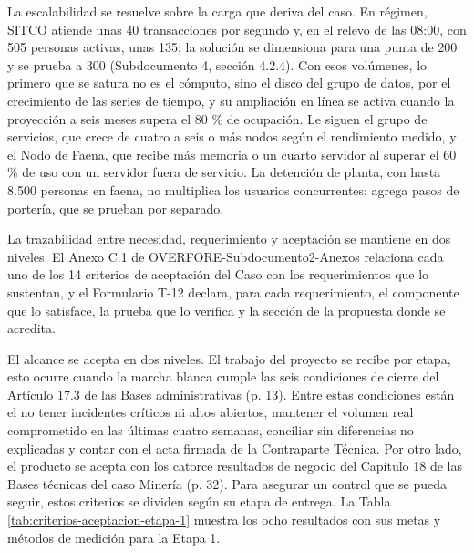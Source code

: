 \documentclass[subdoc]{../../comun/overfore}
\begin{document}
La escalabilidad se resuelve sobre la carga que deriva del caso. En régimen, SITCO atiende unas 40 transacciones por segundo y, en el relevo de las 08:00, con 505 personas activas, unas 135; la solución se dimensiona para una punta de 200 y se prueba a 300 (Subdocumento 4, sección 4.2.4). Con esos volúmenes, lo primero que se satura no es el cómputo, sino el disco del grupo de datos, por el crecimiento de las series de tiempo, y su ampliación en línea se activa cuando la proyección a seis meses supera el 80 \% de ocupación. Le siguen el grupo de servicios, que crece de cuatro a seis o más nodos según el rendimiento medido, y el Nodo de Faena, que recibe más memoria o un cuarto servidor al superar el 60 \% de uso con un servidor fuera de servicio. La detención de planta, con hasta 8.500 personas en faena, no multiplica los usuarios concurrentes: agrega pasos de portería, que se prueban por separado.

La trazabilidad entre necesidad, requerimiento y aceptación se mantiene en dos niveles. El Anexo C.1 de OVERFORE-Subdocumento2-Anexos relaciona cada uno de los 14 criterios de aceptación del Caso con los requerimientos que lo sustentan, y el Formulario T-12 declara, para cada requerimiento, el componente que lo satisface, la prueba que lo verifica y la sección de la propuesta donde se acredita.

El alcance se acepta en dos niveles. El trabajo del proyecto se recibe por etapa, esto ocurre cuando la marcha blanca cumple las seis condiciones de cierre del Artículo 17.3 de las Bases administrativas (p. 13). Entre estas condiciones están el no tener incidentes críticos ni altos abiertos, mantener el volumen real comprometido en las últimas cuatro semanas, conciliar sin diferencias no explicadas y contar con el acta firmada de la Contraparte Técnica. Por otro lado, el producto se acepta con los catorce resultados de negocio del Capítulo 18 de las Bases técnicas del caso Minería (p. 32). Para asegurar un control que se pueda seguir, estos criterios se dividen según su etapa de entrega. La Tabla \ref{tab:criterios-aceptacion-etapa-1} muestra los ocho resultados con sus metas y métodos de medición para la Etapa 1.
\end{document}
